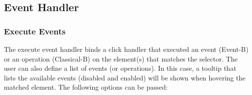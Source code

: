 %
%

\pagebreak

\subsection{Event Handler}
\label{b_event_handler}

\subsubsection{Execute Events}

The execute event handler binds a click handler that executed an event (Event-B) or an operation (Classical-B) on the element(s) that matches the selector.
The user can also define a list of events (or operations).
In this case, a tooltip that lists the available events (disabled and enabled) will be shown when hovering the matched element.
The following options can be passed:

